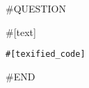 \documentclass[a4paper]{article}
\newenvironment{exercise}{
  \begin{framed}}{
  \end{framed}}
\begin{document}
#QUESTION
\begin{exercise}
\noindent #[text]
\begin{lstlisting}[language=MyJava]
#[texified_code]
\end{lstlisting}
\end{exercise}
\clearpage
#END
\end{document}
